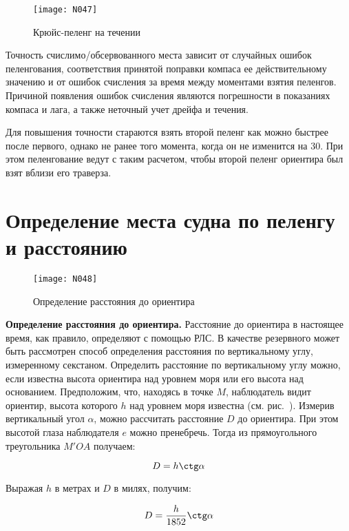 \begin{figure}[htb]
  \centering{}
  \texttt{[image: N047]}
  \caption{Крюйс-пеленг на течении}
  \label{fig:N47}
\end{figure}

Точность счислимо\-/обсервованного места зависит от случайных ошибок
пеленгования, соответствия принятой поправки компаса ее
действительному значению и от ошибок счисления за время между
моментами взятия пеленгов. Причиной появления ошибок счисления
являются погрешности в показаниях компаса и лага, а также неточный
учет дрейфа и течения.

Для повышения точности стараются взять второй пеленг как можно быстрее
после первого, однако не ранее того момента, когда он не изменится на
30\gr. При этом пеленгование ведут с таким расчетом, чтобы
второй пеленг ориентира был взят вблизи его траверза.

\section{Определение места судна по пеленгу и расстоянию}

\begin{figure}[htb]
  \centering{}
  \texttt{[image: N048]}
  \caption{Определение расстояния до ориентира}
  \label{fig:N48}
\end{figure}

\textbf{Определение расстояния до ориентира.} Расстояние до ориентира
в настоящее время, как правило, определяют с помощью РЛС. В качестве
резервного может быть рассмотрен способ определения расстояния по
вертикальному углу, измеренному секстаном. Определить расстояние по
вертикальному углу можно, если известна высота ориентира над уровнем
моря или его высота над основанием. Предположим, что, находясь в точке
$M$, наблюдатель видит ориентир, высота которого $h$ над уровнем моря
известна (см. рис.~). Измерив вертикальный угол $\alpha$,
можно рассчитать расстояние $D$ до ориентира. При этом высотой глаза
наблюдателя $e$ можно пренебречь. Тогда из прямоугольного треугольника
$M'OA$ получаем:

\begin{equation}
  D = h \ctg \alpha 
\end{equation}

Выражая $h$ в метрах и $D$ в милях, получим: 

\begin{equation}
  D = \frac{h}{1852} \ctg \alpha 
\end{equation}

